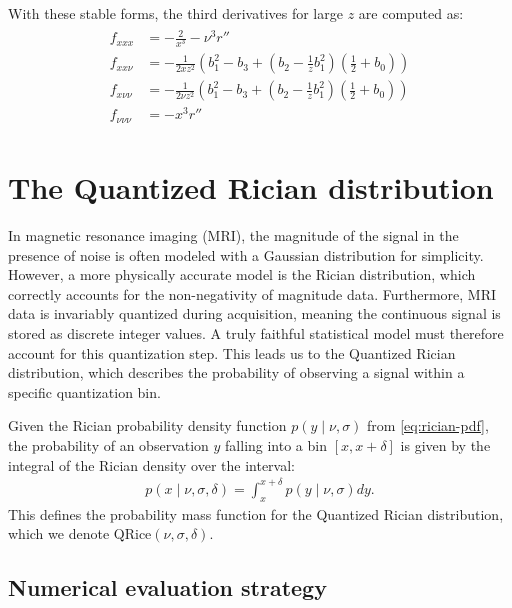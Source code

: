 \documentclass{article}
\begin{document}
With these stable forms, the third derivatives for large $z$ are computed as:
\begin{align}\label{eq:third-derivatives-large-z}
  \boxed{
    \begin{aligned}
      f_{xxx}       & = -\frac{2}{x^3} - \nu^3 r''                                                                      \\
      f_{xx\nu}     & = -\frac{1}{2 x z^2} \left( b_1^2 - b_3 + (b_2 - \frac{1}{z} b_1^2) (\frac{1}{2} + b_0) \right)   \\
      f_{x\nu\nu}   & = -\frac{1}{2 \nu z^2} \left( b_1^2 - b_3 + (b_2 - \frac{1}{z} b_1^2) (\frac{1}{2} + b_0) \right) \\
      f_{\nu\nu\nu} & = -x^3 r''
    \end{aligned}
  }
\end{align}

\section{The Quantized Rician distribution}

In magnetic resonance imaging (MRI), the magnitude of the signal in the presence of noise is often modeled with a Gaussian distribution for simplicity.
However, a more physically accurate model is the Rician distribution, which correctly accounts for the non-negativity of magnitude data.
Furthermore, MRI data is invariably quantized during acquisition, meaning the continuous signal is stored as discrete integer values.
A truly faithful statistical model must therefore account for this quantization step.
This leads us to the Quantized Rician distribution, which describes the probability of observing a signal within a specific quantization bin.

Given the Rician probability density function $p(y \mid \nu, \sigma)$ from \cref{eq:rician-pdf}, the probability of an observation $y$ falling into a bin $[x, x+\delta]$ is given by the integral of the Rician density over the interval:
%
\begin{align}\label{eq:quantized-rician-pmf}
  p(x \mid \nu, \sigma, \delta) = \int_x^{x+\delta} p(y \mid \nu, \sigma) dy.
\end{align}
%
This defines the probability mass function for the Quantized Rician distribution, which we denote $\mathrm{QRice}(\nu, \sigma, \delta)$.

\subsection{Numerical evaluation strategy}
\end{document}
